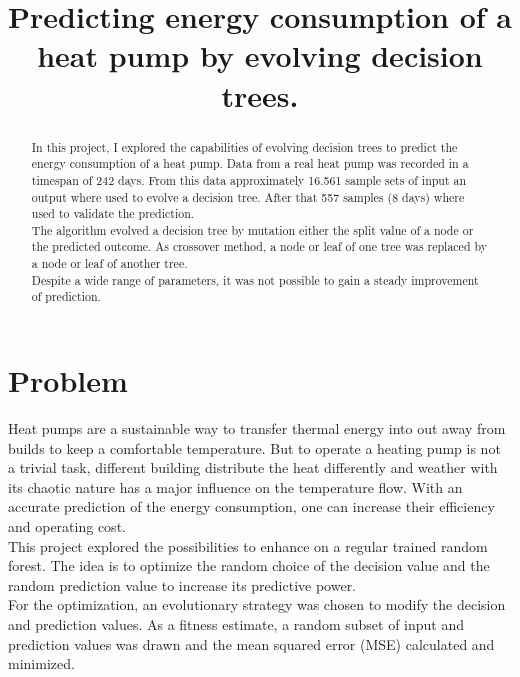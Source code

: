 \documentclass[conference]{IEEEtran}
\begin{document}
%
\title{Predicting energy consumption of a heat pump
by evolving decision trees.}


\author{
}

\maketitle


\begin{abstract}
In this project, I explored the capabilities of evolving decision trees to predict the energy consumption of a heat pump. Data from a real heat pump was recorded in a timespan of 242 days. From this data approximately 16.561 sample sets of input an output where used to evolve a decision tree. After that 557 samples (8 days) where used to validate the prediction.\\
The algorithm evolved a decision tree by mutation either the split value of a node or the predicted outcome. As crossover method, a node or leaf of one tree was replaced by a node or leaf of another tree.\\
Despite a wide range of parameters, it was not possible to gain a steady improvement of prediction. 
\end{abstract}
\IEEEpeerreviewmaketitle



\section{Problem}
Heat pumps are a sustainable way to transfer thermal energy into out away from builds to keep a comfortable temperature. But to operate a heating pump is not a trivial task, different building distribute the heat differently and weather with its chaotic nature has a major influence on the temperature flow. With an accurate prediction of the energy consumption, one can increase their efficiency and operating cost.\\
This project explored the possibilities to enhance on a regular trained random forest. The idea is to optimize the random choice of the decision value and the random prediction value to increase its predictive power.\\
For the optimization, an evolutionary strategy was chosen to modify the decision and prediction values. As a fitness estimate, a random subset of input and prediction values was drawn and the mean squared error (MSE) calculated and minimized. 
\end{document}

